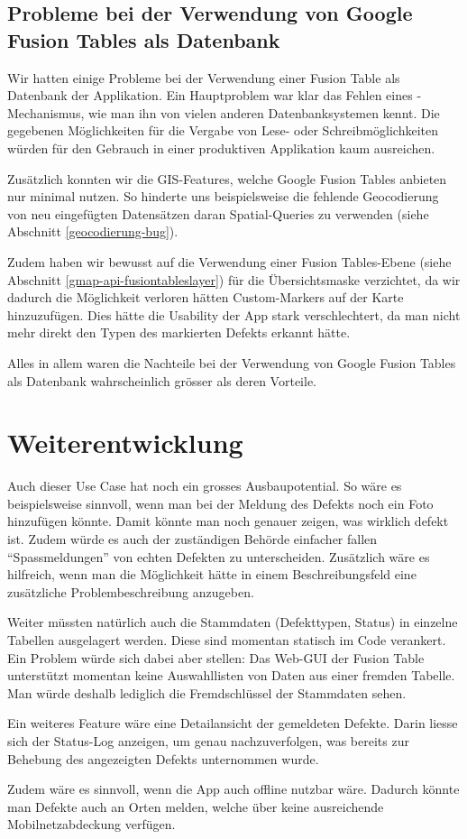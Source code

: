 \subsection{Probleme bei der Verwendung von Google Fusion Tables als Datenbank}
Wir hatten einige Probleme bei der Verwendung einer Fusion Table als Datenbank der Applikation. Ein Hauptproblem war klar das Fehlen eines -Mechanismus, wie man ihn von vielen anderen Datenbanksystemen kennt. Die gegebenen Möglichkeiten für die Vergabe von Lese- oder Schreibmöglichkeiten würden für den Gebrauch in einer produktiven Applikation kaum ausreichen.

Zusätzlich konnten wir die \gls{GIS}-Features, welche Google Fusion Tables anbieten nur minimal nutzen. So hinderte uns beispielsweise die fehlende \gls{Geocodierung} von neu eingefügten Datensätzen daran Spatial-Queries zu verwenden (siehe Abschnitt \ref{geocodierung-bug}).

Zudem haben wir bewusst auf die Verwendung einer Fusion Tables-Ebene (siehe Abschnitt \ref{gmap-api-fusiontableslayer}) für die Übersichtsmaske verzichtet, da wir dadurch die Möglichkeit verloren hätten Custom-Markers auf der Karte hinzuzufügen. Dies hätte die Usability der App stark verschlechtert, da man nicht mehr direkt den Typen des markierten Defekts erkannt hätte.

Alles in allem waren die Nachteile bei der Verwendung von Google Fusion Tables als Datenbank wahrscheinlich grösser als deren Vorteile.

\section{Weiterentwicklung}
Auch dieser Use Case hat noch ein grosses Ausbaupotential. So wäre es beispielsweise sinnvoll, wenn man bei der Meldung des Defekts noch ein Foto hinzufügen könnte. Damit könnte man noch genauer zeigen, was wirklich defekt ist. Zudem würde es auch der zuständigen Behörde einfacher fallen "`Spassmeldungen"' von echten Defekten zu unterscheiden. Zusätzlich wäre es hilfreich, wenn man die Möglichkeit hätte in einem Beschreibungsfeld eine zusätzliche Problembeschreibung anzugeben.

Weiter müssten natürlich auch die Stammdaten (Defekttypen, Status) in einzelne Tabellen ausgelagert werden. Diese sind momentan statisch im Code verankert. Ein Problem würde sich dabei aber stellen: Das Web-GUI der Fusion Table unterstützt momentan keine Auswahllisten von Daten aus einer fremden Tabelle. Man würde deshalb lediglich die Fremdschlüssel der Stammdaten sehen.

Ein weiteres Feature wäre eine Detailansicht der gemeldeten Defekte. Darin liesse sich der Status-Log anzeigen, um genau nachzuverfolgen, was bereits zur Behebung des angezeigten Defekts unternommen wurde. 

Zudem wäre es sinnvoll, wenn die App auch offline nutzbar wäre. Dadurch könnte man Defekte auch an Orten melden, welche über keine ausreichende Mobilnetzabdeckung verfügen.
